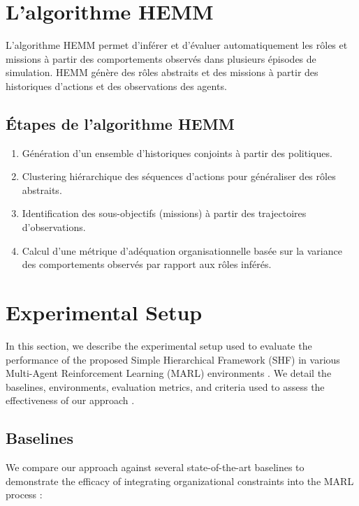 \documentclass[sigconf,anonymous]{aamas}
\begin{document}
\section{L'algorithme HEMM}
\label{sec:hemm_algorithm}
L'algorithme HEMM permet d'inférer et d'évaluer automatiquement les rôles et missions à partir des comportements observés dans plusieurs épisodes de simulation. HEMM génère des rôles abstraits et des missions à partir des historiques d'actions et des observations des agents.

\subsection{Étapes de l'algorithme HEMM}
\begin{enumerate}
    \item Génération d'un ensemble d'historiques conjoints à partir des politiques.
    \item Clustering hiérarchique des séquences d'actions pour généraliser des rôles abstraits.
    \item Identification des sous-objectifs (missions) à partir des trajectoires d'observations.
    \item Calcul d'une métrique d'adéquation organisationnelle basée sur la variance des comportements observés par rapport aux rôles inférés.
\end{enumerate}

\section{Experimental Setup}
\label{sec:experimental_setup}

In this section, we describe the experimental setup used to evaluate the performance of the proposed Simple Hierarchical Framework (SHF) in various Multi-Agent Reinforcement Learning (MARL) environments \cite{hubner2010moise}. We detail the baselines, environments, evaluation metrics, and criteria used to assess the effectiveness of our approach \cite{foerster2018counterfactual, soule2024}.


\subsection{Baselines}
We compare our approach against several state-of-the-art baselines to demonstrate the efficacy of integrating organizational constraints into the MARL process \cite{foerster2018counterfactual}:
\end{document}
